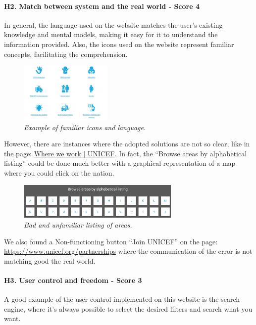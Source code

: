 \paragraph{H2. Match between system and the real world - Score 4}	In general, the language used on the website matches the user’s existing knowledge and mental models, making it easy for it to understand the information provided. Also, the icons used on the website represent familiar concepts, facilitating the comprehension.
\begin{figure}[!h]
	\begin{center}
		\includegraphics[width=0.4\textwidth]{FinalScores4.jpg}
		\captionsetup{font=small}
		\caption{\textit{Example of familiar icons and language.}}
	\end{center}
\end{figure}
\newline However, there are instances where the adopted solutions are not so clear, like in the page: \href{https://www.unicef.org/where-we-work}{Where we work | UNICEF}. In fact, the “Browse areas by alphabetical listing” could be done much better with a graphical representation of a map where you could click on the nation.
\begin{figure}[!h]
	\begin{center}
		\includegraphics[width=0.7\textwidth]{FinalScores5.jpg}
		\captionsetup{font=small}
		\caption{\textit{Bad and unfamiliar listing of areas.}}
	\end{center}
\end{figure}
\newline We also found a Non-functioning button “Join UNICEF” on the page: 
\newline \href{https://www.unicef.org/partnerships}{https://www.unicef.org/partnerships} where the communication of the error is not matching good the real world.
\newline
\newline \paragraph{H3. User control and freedom - Score 3}	A good example of the user control implemented on this website is the search engine, where it’s always possible to select the desired filters and search what you want.
